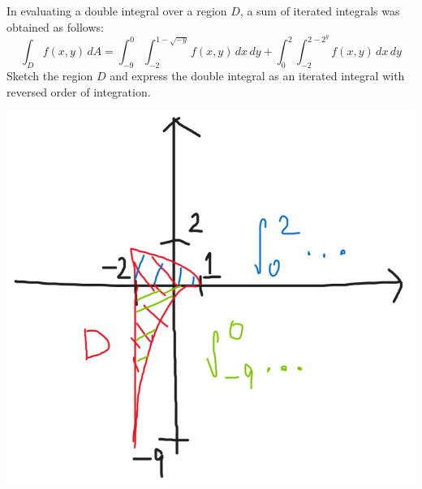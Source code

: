 \documentclass[12pt]{exam}
\begin{document}
\begin{questions}
\clearpage
\question In evaluating a double integral over a region $D$, a sum of iterated integrals was obtained as follows:
\[ \int_{D}f(x, y)\,dA=\int_{-9}^{0}\int_{-2}^{1-\sqrt{-y}}f(x, y)\, dx\, dy + \int_{0}^{2}\int_{-2}^{2-2^y}f(x, y)\, dx\, dy\]
Sketch the region $D$ and express the double integral as an iterated integral with reversed order of
integration.
    \begin{solution}
        \begin{center}
            \includegraphics*[scale=0.5]{images/06-sketch.png}

\end{center}
\end{solution}
\end{questions}
\end{document}
